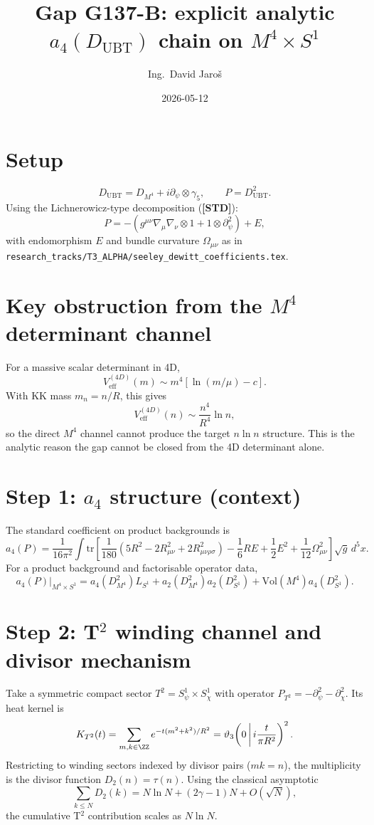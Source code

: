 \documentclass[12pt,a4paper]{article}
\title{Gap G137-B: explicit analytic $a_4(D_{\mathrm{UBT}})$ chain on $M^4\times S^1$}
\author{Ing.\ David Jaroš}
\date{2026-05-12}
\begin{document}
\maketitle

\section{Setup}
\[
D_{\mathrm{UBT}} = D_{M^4} + i\partial_\psi\otimes\gamma_5,
\qquad
P=D_{\mathrm{UBT}}^2.
\]
Using the Lichnerowicz-type decomposition (\textbf{[STD]}):
\[
P = -\left(g^{\mu\nu}\nabla_\mu\nabla_\nu\otimes 1 + 1\otimes\partial_\psi^2\right)+E,
\]
with endomorphism $E$ and bundle curvature $\Omega_{\mu\nu}$ as in
\texttt{research\_tracks/T3\_ALPHA/seeley\_dewitt\_coefficients.tex}.

\section{Key obstruction from the $M^4$ determinant channel}
For a massive scalar determinant in 4D,
\[
V_{\mathrm{eff}}^{(4D)}(m)\sim m^4\!\left[\ln(m/\mu)-c\right].
\]
With KK mass \(m_n=n/R\), this gives
\[
V_{\mathrm{eff}}^{(4D)}(n)\sim \frac{n^4}{R^4}\ln n,
\]
so the direct \(M^4\) channel cannot produce the target \(n\ln n\) structure.
This is the analytic reason the gap cannot be closed from the 4D determinant alone.

\section{Step 1: $a_4$ structure (context)}
The standard coefficient on product backgrounds is
\[
a_4(P)=\frac{1}{16\pi^2}\int \mathrm{tr}\!\left[
\frac{1}{180}\!\left(5R^2-2R_{\mu\nu}^2+2R_{\mu\nu\rho\sigma}^2\right)
-\frac{1}{6}RE+\frac12E^2+\frac1{12}\Omega_{\mu\nu}^2
\right]\sqrt{g}\,d^5x.
\]
For a product background and factorisable operator data,
\[
a_4(P)|_{M^4\times S^1}
=a_4(D_{M^4}^2)L_{S^1}
+a_2(D_{M^4}^2)a_2(D_{S^1}^2)
+\mathrm{Vol}(M^4)a_4(D_{S^1}^2).
\]

\section{Step 2: T$^2$ winding channel and divisor mechanism}
Take a symmetric compact sector
\(
T^2=S^1_\psi\times S^1_\chi
\)
with operator \(P_{T^2}=-\partial_\psi^2-\partial_\chi^2\).
Its heat kernel is
\[
K_{T^2}(t)=\sum_{m,k\in\ZZ}e^{-t(m^2+k^2)/R^2}
=\vartheta_3\!\left(0\,\middle|\,i\frac{t}{\pi R^2}\right)^2.
\]
Restricting to winding sectors indexed by divisor pairs (\(mk=n\)),
the multiplicity is the divisor function \(D_2(n)=\tau(n)\).
Using the classical asymptotic
\[
\sum_{k\le N}D_2(k)=N\ln N+(2\gamma-1)N+O(\sqrt N),
\]
the cumulative T$^2$ contribution scales as \(N\ln N\).
\end{document}
